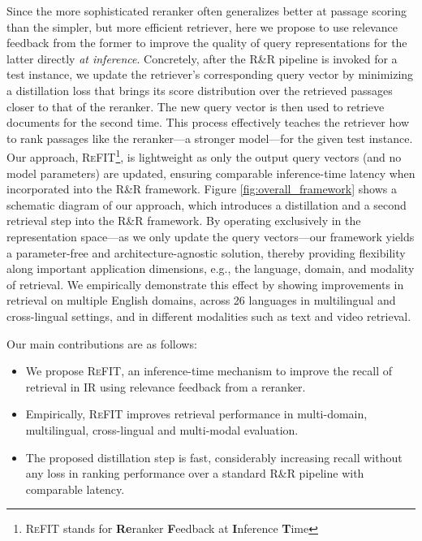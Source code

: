 Since the more sophisticated reranker often generalizes better at passage scoring than the simpler, but more efficient retriever, here we propose to use relevance feedback from the former to improve the quality of query representations for the latter directly \textit{at inference}.
Concretely, after the R\&R pipeline is invoked for a test instance, we update the retriever's corresponding query vector by minimizing a distillation loss that brings its score distribution over the retrieved passages closer to that of the reranker.
The new query vector is then used to retrieve documents for the second time. 
This process effectively teaches the retriever how to rank passages like the reranker---a stronger model---for the given test instance.
Our approach, \textsc{ReFIT}\footnote{\textsc{ReFIT} stands for \textbf{Re}ranker \textbf{F}eedback at \textbf{I}nference \textbf{T}ime}, is lightweight as only the output query vectors (and no model parameters) are updated, ensuring comparable inference-time latency when incorporated into the R\&R framework. 
Figure \ref{fig:overall_framework} shows a schematic diagram of our approach, which introduces a distillation and a second retrieval step into the R\&R framework.
By operating exclusively in the representation space---as we only update the query vectors---our framework yields a parameter-free and architecture-agnostic solution, thereby providing flexibility along important application dimensions, e.g., the language, domain, and modality of retrieval. 
We empirically demonstrate this effect by showing improvements in retrieval on multiple English domains, across 26 languages in multilingual and cross-lingual settings, and in different modalities such as text and video retrieval.
 

Our main contributions are as follows:
\begin{itemize}
    \item We propose \textsc{ReFIT}, an inference-time mechanism to improve the recall of retrieval in IR using relevance feedback from a reranker.
    \item Empirically, \textsc{ReFIT} improves retrieval performance in multi-domain, multilingual, cross-lingual and multi-modal evaluation.
    \item The proposed distillation step is fast, considerably increasing recall without any loss in ranking performance over a standard R\&R pipeline with comparable latency.
\end{itemize}


